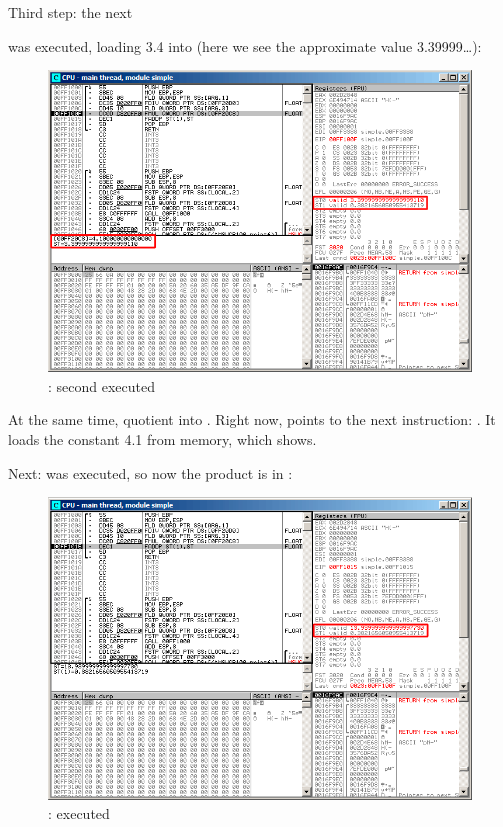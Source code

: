 \clearpage
Third step: the next \FLD 

was executed, loading 3.4 into  (here we see the approximate value 3.39999\ldots): 

\begin{figure}[H]
\centering
\includegraphics[scale=\FigScale]{patterns/12_FPU/1_simple/olly3.png}
\caption{\olly: second \FLD executed}
\label{fig:FPU_simple_olly_3}
\end{figure}

At the same time, \gls{quotient}  into .
Right now, \EIP points to the next instruction: \FMUL. 
It loads the constant 4.1 from memory, which \olly shows.

\clearpage
Next: \FMUL %
was executed, so now the \gls{product} is in :

\begin{figure}[H]
\centering
\includegraphics[scale=\FigScale]{patterns/12_FPU/1_simple/olly4.png}
\caption{\olly: \FMUL executed}
\label{fig:FPU_simple_olly_4}
\end{figure}

